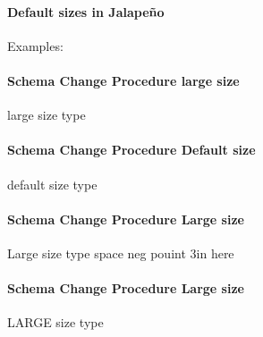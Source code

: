 \paragraph{Default sizes in Jalape\~no}

\begin{table}[htbp]

\centering

\caption{Default Sizes}
\end{table}

Examples:
\vspace{-.3in}

\paragraph*{\large Schema Change Procedure large size}

{\large large size type}

\paragraph*{Schema Change Procedure Default size}

default size type

\paragraph*{\Large Schema Change Procedure Large size}

{\Large Large size type}
space neg pouint 3in here
\vspace{-.3in}

\paragraph*{\LARGE Schema Change Procedure Large size}

{\LARGE LARGE size type}
\vspace{.1in}

